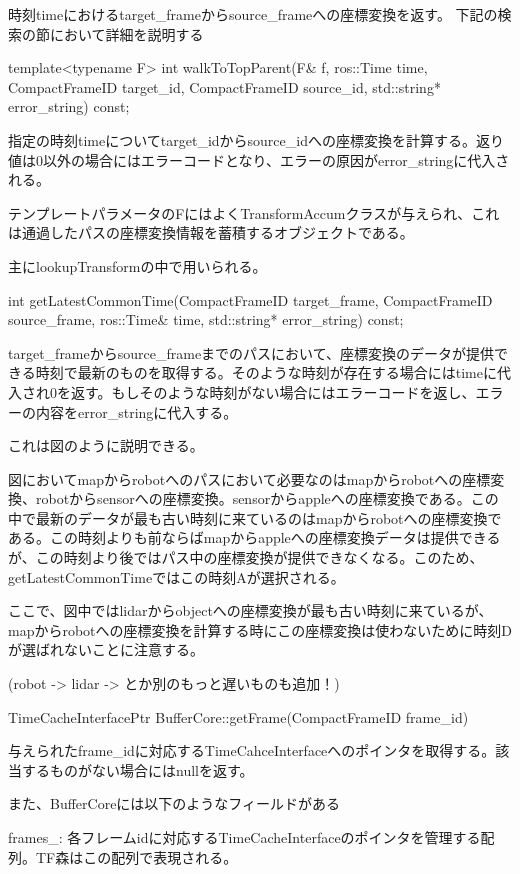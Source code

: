 \documentclass{jarticle}
\begin{document}
\begin{multicols}{2}
時刻timeにおけるtarget\_frameからsource\_frameへの座標変換を返す。
下記の検索の節において詳細を説明する


template<typename F> int walkToTopParent(F\& f, ros::Time time, CompactFrameID target\_id, CompactFrameID source\_id, std::string* error\_string) const;


指定の時刻timeについてtarget\_idからsource\_idへの座標変換を計算する。返り値は0以外の場合にはエラーコードとなり、エラーの原因がerror\_stringに代入される。

テンプレートパラメータのFにはよくTransformAccumクラスが与えられ、これは通過したパスの座標変換情報を蓄積するオブジェクトである。

主にlookupTransformの中で用いられる。

int getLatestCommonTime(CompactFrameID target\_frame, CompactFrameID source\_frame, ros::Time\& time, std::string* error\_string) const;

target\_frameからsource\_frameまでのパスにおいて、座標変換のデータが提供できる時刻で最新のものを取得する。そのような時刻が存在する場合にはtimeに代入され0を返す。もしそのような時刻がない場合にはエラーコードを返し、エラーの内容をerror\_stringに代入する。

これは図のように説明できる。

図においてmapからrobotへのパスにおいて必要なのはmapからrobotへの座標変換、robotからsensorへの座標変換。sensorからappleへの座標変換である。この中で最新のデータが最も古い時刻に来ているのはmapからrobotへの座標変換である。この時刻よりも前ならばmapからappleへの座標変換データは提供できるが、この時刻より後ではパス中の座標変換が提供できなくなる。このため、getLatestCommonTimeではこの時刻Aが選択される。

ここで、図中ではlidarからobjectへの座標変換が最も古い時刻に来ているが、mapからrobotへの座標変換を計算する時にこの座標変換は使わないために時刻Dが選ばれないことに注意する。

(robot -> lidar -> とか別のもっと遅いものも追加！)

TimeCacheInterfacePtr BufferCore::getFrame(CompactFrameID frame\_id)

与えられたframe\_idに対応するTimeCahceInterfaceへのポインタを取得する。該当するものがない場合にはnullを返す。

また、BufferCoreには以下のようなフィールドがある



frames\_: 各フレームidに対応するTimeCacheInterfaceのポインタを管理する配列。TF森はこの配列で表現される。





\end{multicols}
\end{document}
